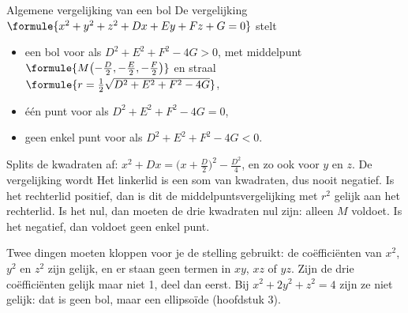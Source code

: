 \begin{theorie}
\begin{stelling}{Algemene vergelijking van een bol}
De vergelijking \quad $\formule{x^2 + y^2 + z^2 + Dx + Ey + Fz + G = 0}$ \quad stelt

\vspace{1mm}
\begin{itemize}
\item een bol voor als $D^2 + E^2 + F^2 - 4G > 0$, met middelpunt $\formule{M\bigl(-\tfrac D2, -\tfrac E2, -\tfrac F2\bigr)}$ en straal $\formule{r = \tfrac12\sqrt{D^2 + E^2 + F^2 - 4G}}$,
\item één punt voor als $D^2 + E^2 + F^2 - 4G = 0$,
\item geen enkel punt voor als $D^2 + E^2 + F^2 - 4G < 0$.
\end{itemize}
\end{stelling}

\begin{bewijs}
Splits de kwadraten af: $x^2 + Dx = \bigl(x + \tfrac D2\bigr)^2 - \tfrac{D^2}{4}$, en zo ook voor $y$ en $z$. De vergelijking wordt
Het linkerlid is een som van kwadraten, dus nooit negatief. Is het rechterlid positief, dan is dit de middelpuntsvergelijking met $r^2$ gelijk aan het rechterlid. Is het nul, dan moeten de drie kwadraten nul zijn: alleen $M$ voldoet. Is het negatief, dan voldoet geen enkel punt.
\end{bewijs}
\end{theorie}

Twee dingen moeten kloppen voor je de stelling gebruikt: de coëfficiënten van $x^2$, $y^2$ en $z^2$ zijn gelijk, en er staan geen termen in $xy$, $xz$ of $yz$. Zijn de drie coëfficiënten gelijk maar niet 1, deel dan eerst. Bij $x^2 + 2y^2 + z^2 = 4$ zijn ze niet gelijk: dat is geen bol, maar een ellipsoïde (hoofdstuk 3).


